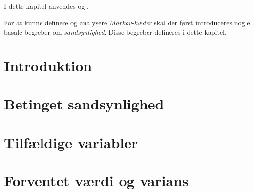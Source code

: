 I dette kapitel anvendes \cite[s. 1-111]{olofsson2005probability} og \cite[s. 24-32]{oxford}. 

For at kunne definere og analysere \textit{Markov-kæder} skal der først introduceres nogle basale begreber om \textit{sandsynlighed}. Disse begreber defineres i dette kapitel. 

\section{Introduktion}


\section{Betinget sandsynlighed}


\section{Tilfældige variabler}


%

\section{Forventet værdi og varians}


%



